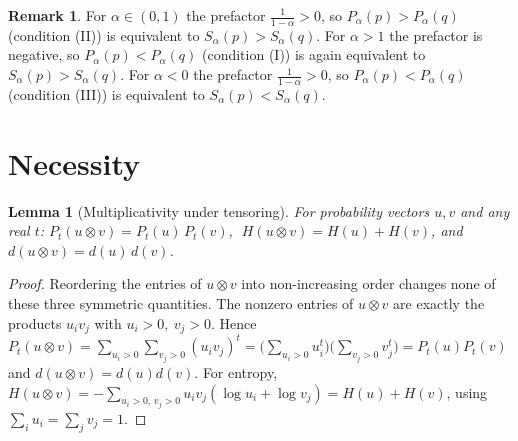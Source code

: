 \documentclass{amsart}
\theoremstyle{plain}
\newtheorem{lemma}{Lemma}
\theoremstyle{definition}
\newtheorem{remark}{Remark}
\begin{document}
\begin{remark}\label{rem:renyi}
For $\alpha\in(0,1)$ the prefactor $\frac1{1-\alpha}>0$, so $P_\alpha(p)>P_\alpha(q)$
(condition (II)) is equivalent to $S_\alpha(p)>S_\alpha(q)$. For $\alpha>1$ the
prefactor is negative, so $P_\alpha(p)<P_\alpha(q)$ (condition (I)) is again equivalent
to $S_\alpha(p)>S_\alpha(q)$. For $\alpha<0$ the prefactor $\frac1{1-\alpha}>0$, so
$P_\alpha(p)<P_\alpha(q)$ (condition (III)) is equivalent to $S_\alpha(p)<S_\alpha(q)$.
\end{remark}

\section{Necessity}\label{sec:nec}

\begin{lemma}[Multiplicativity under tensoring]\label{lem:mult}
For probability vectors $u,v$ and any real $t$: $P_t(u\otimes v)=P_t(u)\,P_t(v)$,
$\;H(u\otimes v)=H(u)+H(v)$, and $d(u\otimes v)=d(u)\,d(v)$.
\end{lemma}
\begin{proof}
Reordering the entries of $u\otimes v$ into non-increasing order changes none of these
three symmetric quantities. The nonzero entries of $u\otimes v$ are exactly the
products $u_iv_j$ with $u_i>0,\ v_j>0$. Hence
$P_t(u\otimes v)=\sum_{u_i>0}\sum_{v_j>0}(u_iv_j)^t
=\big(\sum_{u_i>0}u_i^t\big)\big(\sum_{v_j>0}v_j^t\big)=P_t(u)P_t(v)$ and
$d(u\otimes v)=d(u)d(v)$. For entropy,
$H(u\otimes v)=-\sum_{u_i>0,\,v_j>0}u_iv_j(\log u_i+\log v_j)=H(u)+H(v)$, using
$\sum_i u_i=\sum_j v_j=1$.
\end{proof}
\end{document}
